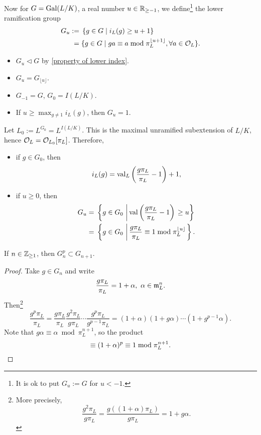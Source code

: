 Now for $G = \operatorname{Gal}(L/K)$, a real number $u\in\mathbb{R}_{\ge -1}$,
we define\footnote{It is ok to put $G_u := G$ for $u < -1$.} the lower ramification group
\begin{align*}
    G_u := {}& \left\{ g\in G\mid i_L(g)\ge u + 1 \right\}\\
    = {}& \{g\in G\mid ga \equiv a\bmod {\pi_L^{\lfloor u+1\rfloor}},\forall a\in\mathcal{O}_L\}.
\end{align*}

\begin{itemize}
    \item $G_u\vartriangleleft G$ by \cref{property of lower index}.
    \item $G_u = G_{\lfloor u\rfloor}$.
    \item $G_{-1} = G$, $G_0 = I(L/K)$.
    \item If $u\ge \max_{g\ne 1} i_L(g)$,
    then $G_u = 1$.
\end{itemize}

Let $L_0 := L^{G_0} = L^{I(L/K)}$.
This is the maximal unramified subextension of $L/K$, hence $\mathcal{O}_L = \mathcal{O}_{L_0}[\pi_L]$.
Therefore, \begin{itemize}
    \item if $g\in G_0$,
then \[i_L(g) = \operatorname{val}_L\left( \frac{g\pi_L}{\pi_L} - 1 \right) + 1,\]
    \item if $u\ge 0$, then \begin{align*}
        G_u = {}& \left\{g\in G_0\,\left|\, \operatorname{val}\left( \frac{g\pi_L}{\pi_L} - 1 \right)\right.\ge u\right\}\\
        = {}& \left\{ g\in G_0\,\left|\,
            \frac{g\pi_L}{\pi_L}\equiv 1\bmod\pi_L^{\lfloor u\rfloor}
        \right. \right\}.
    \end{align*}
\end{itemize}
\begin{lemma}
    If $n\in\mathbb{Z}_{\ge 1}$,
    then $G_n^p\subset G_{n+1}$.
\end{lemma}
\begin{proof}
    Take $g\in G_n$ and write \[\frac{g\pi_L}{\pi_L} = 1 + \alpha,\ \alpha\in\mathfrak{m}_L^n.\]
    Then\footnote{
        More precisely,\[\frac{g^2\pi_L}{g\pi_L} = \frac{g((1 + \alpha)\pi_L)}{g\pi_L} = 1 + g\alpha.\]
        }
    \[\frac{g^p\pi_L }{\pi_L} = \frac{g\pi_L }{\pi_L}\frac{g^2\pi_L}{g\pi_L}\cdots\frac{g^p\pi_L}{g^{p-1}\pi_L} = (1 + \alpha)(1 + g\alpha)\cdots(1 +g^{p-1}\alpha).\]
    Note that $g\alpha\equiv\alpha\bmod\pi_L^{n+1}$,
    so the product\[\equiv (1 + \alpha)^{p}\equiv 1\bmod\pi_L^{n+1}.\qedhere\]
\end{proof}

